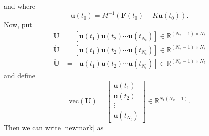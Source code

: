 \documentclass[a4paper, 10pt]{article}
\begin{document}
and where
$$
\ddot{\mathbf{u}}(t_0) = M^{-1}\left( \mathbf{F}(t_0) - K \mathbf{u}(t_0) \right).
$$
Now, put
\begin{align*}
\mathbf{U} & = \left[\mathbf{u}(t_1) \mathbf{u}(t_2) \cdots \mathbf{u}(t_{N_t})\right] \in \mathbb{R}^{(N_x-1) \times N_t} \\
\dot{\mathbf{U}} & = \left[\dot{\mathbf{u}}(t_1) \dot{\mathbf{u}}(t_2) \cdots \dot{\mathbf{u}}(t_{N_t})\right] \in \mathbb{R}^{(N_x-1) \times N_t} \\
\ddot{\mathbf{U}} & = \left[\ddot{\mathbf{u}}(t_1) \ddot{\mathbf{u}}(t_2) \cdots \ddot{\mathbf{u}}(t_{N_t})\right] \in \mathbb{R}^{(N_x-1) \times N_t} 
\end{align*}
and define
$$
\mathrm{vec}(\mathbf{U}) = \left[
\begin{array}{c}
\mathbf{u}(t_1)\\
\mathbf{u}(t_2) \\
\vdots \\
\mathbf{u}(t_{N_t}) 
\end{array}
\right] \in \mathbb{R}^{N_t(N_x-1)}.
$$
Then we can write \eqref{newmark}  as
\end{document}
